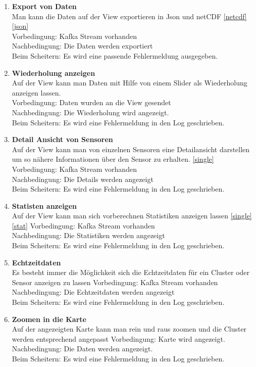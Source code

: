 \begin{enumerate}[label=\textbf{PF\arabic{enumi}0}]
	\item \textbf{Export von Daten}\\
		Man kann die Daten auf der View exportieren in Json und netCDF \ref{netcdf} \ref{json}	\\
		Vorbedingung: Kafka Stream vorhanden \\
		Nachbedingung: Die Daten werden exportiert \\ 
		Beim Scheitern: Es wird eine passende Fehlermeldung ausgegeben.
		
	\item \textbf{Wiederholung anzeigen}\\
		Auf der View kann man Daten mit Hilfe von einem Slider als Wiederholung anzeigen lassen.\\
		Vorbedingung: Daten wurden an die View gesendet\\
		Nachbedingung: Die Wiederholung wird angezeigt.\\ 
		Beim Scheitern: Es wird eine Fehlermeldung in den Log geschrieben.
		

	\item \textbf{Detail Ansicht von Sensoren}\\
		Auf der View kann man von einzelnen Sensoren eine Detailansicht darstellen um so nähere Informationen über den Sensor zu erhalten. \ref{single}
		Vorbedingung: Kafka Stream vorhanden \\
		Nachbedingung: Die Details werden angezeigt \\ 
		Beim Scheitern: Es wird eine Fehlermeldung in den Log geschrieben.
		
	\item \textbf{Statisten anzeigen}\\
		Auf der View kann man sich vorberechnen Statistiken anzeigen lassen \ref{single}\ref{stat}
		Vorbedingung: Kafka Stream vorhanden \\
		Nachbedingung: Die Statistiken werden angezeigt \\ 
		Beim Scheitern: Es wird eine Fehlermeldung in den Log geschrieben.
		
	\item \textbf{Echtzeitdaten}\\
		Es besteht immer die Möglichkeit sich die Echtzeitdaten für ein Cluster oder Sensor anzeigen zu lassen
		Vorbedingung: Kafka Stream vorhanden \\
		Nachbedingung: Die Echtzeitdaten werden angezeigt\\ 
		Beim Scheitern: Es wird eine Fehlermeldung in den Log geschrieben.
		
	\item \textbf{Zoomen in die Karte}\\
		Auf der angezeigten Karte kann man rein und raus zoomen und die Cluster werden entsprechend angepasst
		Vorbedingung: Karte wird angezeigt. \\
		Nachbedingung: Die Daten werden angezeigt.\\ 
		Beim Scheitern: Es wird eine Fehlermeldung in den Log geschrieben.
		
		
\end{enumerate}

